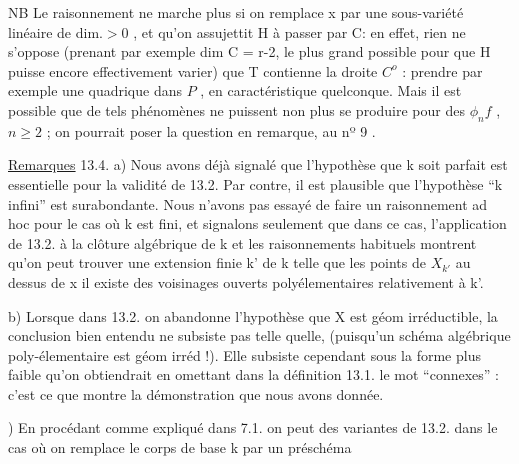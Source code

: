 
NB \quad Le raisonnement ne marche plus si on remplace x par une
sous-variété linéaire  de dim.$>0$ , et qu'on assujettit H à passer
par C: en effet, rien ne s'oppose (prenant par exemple dim C = r-2, le
plus grand possible pour que H puisse encore effectivement varier) que
T contienne la droite $C^{o}$ :
 prendre par
exemple une quadrique  dans $P$ , en caractéristique quelconque. Mais il
est possible que de tels phénomènes ne puissent non plus se produire 
pour des $\phi_n f$ , $n\geq 2$ ; on pourrait poser la question en remarque, au
nº 9 .

\uline{Remarques} 13.4. \quad a) Nous avons déjà signalé que l'hypothèse que k 
soit parfait est essentielle pour la validité de 13.2. Par contre, il
est plausible que l'hypothèse ``k infini'' est surabondante. 
Nous n'avons pas essayé  de faire un raisonnement ad hoc pour le cas
où k est fini, et signalons seulement que dans ce cas, l'application de
13.2. à la clôture algébrique de k et les raisonnements habituels
montrent qu'on peut trouver une extension finie k' de k telle que
  les points de $X_{k'}$ au dessus de x il existe des voisinages ouverts
polyélementaires relativement à k'.

b) Lorsque dans 13.2. on abandonne l'hypothèse que X est géom
irréductible, la conclusion bien entendu ne subsiste pas telle quelle,
(puisqu'un schéma algébrique poly-élementaire est géom irréd !). Elle
subsiste cependant sous la forme plus faible qu'on obtiendrait en
omettant dans la définition 13.1. le mot ``connexes'' : c'est ce que
montre la démonstration que nous avons donnée.

) En procédant comme expliqué dans 7.1. on peut  des variantes
de 13.2. dans le cas où on remplace le corps de base k par un préschéma
